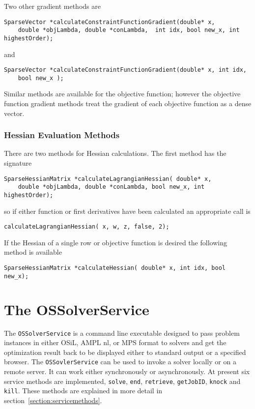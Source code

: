 \documentclass[11pt]{article}
\renewcommand{\_}{{\char"5F}}
\renewcommand{\{}{{\char"7B}}
\renewcommand{\}}{{\char"7D}}
\renewcommand{\^}{{\char"0D}}
\renewcommand{\'}{{\char"0D}}
\begin{document}
Two other gradient methods are
\begin{verbatim}
SparseVector *calculateConstraintFunctionGradient(double* x,
    double *objLambda, double *conLambda,  int idx, bool new_x, int highestOrder);
\end{verbatim}
and
\begin{verbatim}
SparseVector *calculateConstraintFunctionGradient(double* x, int idx,
    bool new_x );
\end{verbatim}

Similar methods are available for the objective function; however the objective function gradient methods treat the gradient of each objective function as a dense vector.


\subsubsection{Hessian Evaluation Methods}

There are two methods for Hessian calculations.  The first method has the signature
\begin{verbatim}
SparseHessianMatrix *calculateLagrangianHessian( double* x,
    double *objLambda, double *conLambda, bool new_x, int highestOrder);
\end{verbatim}
so if either function or first derivatives have been calculated an appropriate call is
\begin{verbatim}
calculateLagrangianHessian( x, w, z, false, 2);
\end{verbatim}
If the Hessian of a single row or objective function is desired the following method is available
\begin{verbatim}
SparseHessianMatrix *calculateHessian( double* x, int idx, bool new_x);
\end{verbatim}

\section{The OSSolverService}\label{section:ossolverservice}

The {\tt OSSolverService} is a command line executable designed to pass problem instances in either  OSiL, AMPL nl, or MPS format  to solvers and get the optimization result back to be displayed either to standard output or a specified browser.  The {\tt OSSovlerService} can be used to invoke a solver locally or on a remote server. It can work either synchronously or asynchronously.
At present six service methods are implemented, {\tt solve}, {\tt end}, {\tt retrieve}, {\tt getJobID}, {\tt knock} and {\tt kill}.
These methods are explained in more detail in section~\ref{section:servicemethods}.
\end{document}
